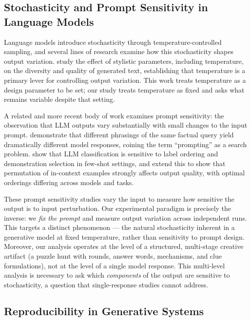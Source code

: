 \subsection{Stochasticity and Prompt Sensitivity in Language Models}

Language models introduce stochasticity through temperature-controlled sampling, and several lines of research examine how this stochasticity shapes output variation. \citet{ficler2017controlling} study the effect of stylistic parameters, including temperature, on the diversity and quality of generated text, establishing that temperature is a primary lever for controlling output variation. This work treats temperature as a design parameter to be set; our study treats temperature as fixed and asks what remains variable despite that setting.

A related and more recent body of work examines prompt sensitivity: the observation that LLM outputs vary substantially with small changes to the input prompt. \citet{jiang2020can} demonstrate that different phrasings of the same factual query yield dramatically different model responses, coining the term ``prompting'' as a search problem. \citet{zhao2021calibrate} show that LLM classification is sensitive to label ordering and demonstration selection in few-shot settings, and \citet{lu2022fantastically} extend this to show that permutation of in-context examples strongly affects output quality, with optimal orderings differing across models and tasks.

These prompt sensitivity studies vary the input to measure how sensitive the output is to input perturbation. Our experimental paradigm is precisely the inverse: we \textit{fix the prompt} and measure output variation across independent runs. This targets a distinct phenomenon --- the natural stochasticity inherent in a generative model at fixed temperature, rather than sensitivity to prompt design. Moreover, our analysis operates at the level of a structured, multi-stage creative artifact (a puzzle hunt with rounds, answer words, mechanisms, and clue formulations), not at the level of a single model response. This multi-level analysis is necessary to ask which \textit{components} of the output are sensitive to stochasticity, a question that single-response studies cannot address.

\subsection{Reproducibility in Generative Systems}

